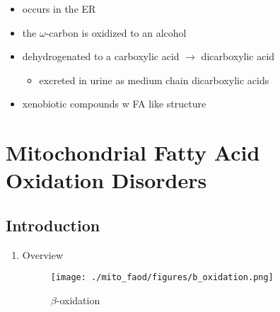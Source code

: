 \documentclass{scrartcl}
\begin{document}
\begin{enumerate}
\begin{itemize}
\item occurs in the ER
\item the \(\omega\)-carbon is oxidized to an alcohol
\item dehydrogenated to a carboxylic acid \(\to\) dicarboxylic acid
\begin{itemize}
\item excreted in urine as medium chain dicarboxylic acids
\end{itemize}
\item xenobiotic compounds w FA like structure
\end{itemize}
\end{enumerate}
\section{Mitochondrial Fatty Acid Oxidation Disorders}
\label{sec:org67c08cf}
\subsection{Introduction}
\label{sec:orga47ae9f}
\begin{enumerate}
\item Overview
\label{sec:org3064cb2}
\begin{figure}[htbp]
\centering
\texttt{[image: ./mito\_faod/figures/b\_oxidation.png]}
\caption{\label{fig:org857270d}
\(\beta\)-oxidation}
\end{figure}
\end{enumerate}
\end{document}
